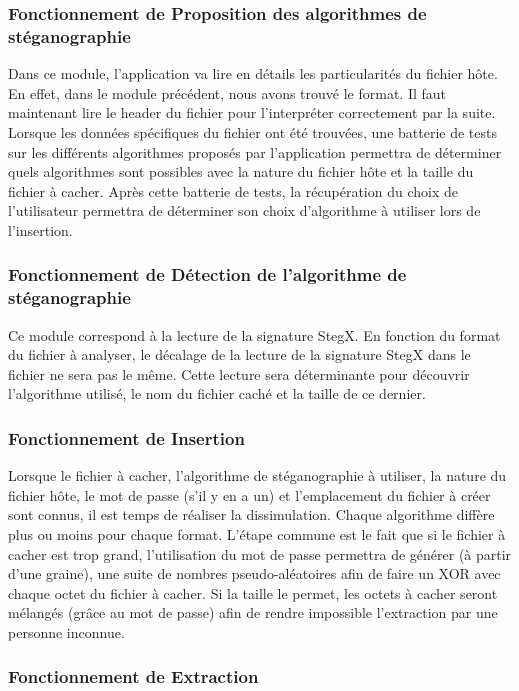 \documentclass[11pt]{article}
\begin{document}
\subsubsection{Fonctionnement de Proposition des algorithmes de stéganographie}

Dans ce module, l'application va lire en détails les particularités du fichier 
hôte. En effet, dans le module précédent, nous avons trouvé le format. Il 
faut maintenant lire le header du fichier pour l'interpréter correctement 
par la suite. Lorsque les données spécifiques du fichier ont été trouvées, 
une batterie de tests sur les différents algorithmes proposés par l'application
permettra de déterminer quels algorithmes sont possibles avec la nature 
du fichier hôte et la taille du fichier à cacher. 
Après cette batterie de tests, la récupération du choix de l'utilisateur 
permettra de déterminer son choix d'algorithme à utiliser lors de l'insertion. 

\subsubsection{Fonctionnement de Détection de l'algorithme de stéganographie}

Ce module correspond à la lecture de la signature StegX. En fonction du 
format du fichier à analyser, le décalage de la lecture de la signature StegX
dans le fichier ne sera pas le même. Cette lecture sera déterminante pour 
découvrir l'algorithme utilisé, le nom du fichier caché et la taille de 
ce dernier. 

\subsubsection{Fonctionnement de Insertion}

Lorsque le fichier à cacher, l'algorithme de stéganographie à utiliser, 
la nature du fichier hôte, le mot de passe (s'il y en a un) et l'emplacement 
du fichier à créer sont connus, il est temps de réaliser la dissimulation. 
Chaque algorithme diffère plus ou moins pour chaque format. 
L'étape commune est le fait que si le fichier à cacher est trop grand, 
l'utilisation du mot de passe permettra de générer (à partir d'une graine), 
une suite de nombres pseudo-aléatoires afin de faire un XOR avec chaque 
octet du fichier à cacher. Si la taille le permet, les octets à cacher 
seront mélangés (grâce au mot de passe) afin de rendre impossible l'extraction 
par une personne inconnue. 

\subsubsection{Fonctionnement de Extraction}
\end{document}
